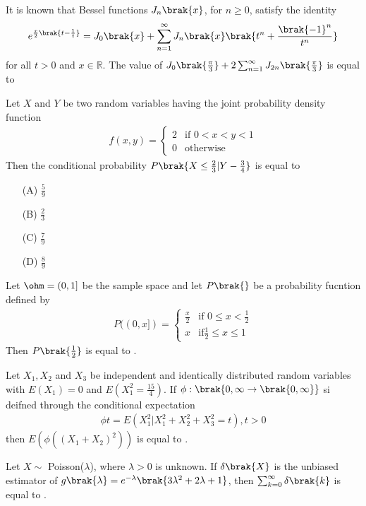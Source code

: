 \item It is known that Bessel functions $J_n\brak{x}$, for $n\geq 0$, satisfy the identity 
\begin{align*}
    e^{\frac{x}{2}\brak{t-\frac{1}{t}}}=J_0\brak{x}+\sum_{n=1}^\infty J_n\brak{x}\brak{t^n+\frac{\brak{-1}^n}{t^n}}
\end{align*}
for all $t>0$ and $x \in \mathbb{R}$. The value of $J_0\brak{\frac{\pi}{3}}+2\sum_{n=1}^\infty J_{2n}\brak{\frac{\pi}{3}}$ is equal to
\vspace{0.5cm}

\item Let $X$ and $Y$ be two random variables having the joint probability density function
\begin{align*}
    f(x, y) = \begin{cases}
    2 & \text{if } 0 < x < y < 1 \\
    0 & \text{otherwise}
\end{cases}
\end{align*}
Then the conditional probability $P\brak{X\leq \frac{2}{3}| Y-\frac{3}{4}}$ is equal to
\begin{multicols}{2}
\begin{enumerate}
    \item[(A)] $\frac{5}{9}$
    \item[(B)] $\frac{2}{3}$
    \item[(C)] $\frac{7}{9}$
    \item[(D)] $\frac{8}{9}$
\end{enumerate}
\end{multicols}

\vspace{0.5cm}

\item Let $\ohm =(0,1]$ be the sample space and let $P\brak{}$ be a probability fucntion defined by 
\begin{align*}
    P((0, x]) = \begin{cases}
    \frac{x}{2} & \text{if } 0 \leq x < \frac{1}{2} \\
    x & \text{if} \frac{1}{2}\leq x \leq 1
\end{cases}
\end{align*}
Then $P\brak{{{\frac{1}{2}}}}$ is equal to \underline{\hspace{2cm}}.
\vspace{0.5cm}

\item Let $X_1,X_2$ and $X_3$ be independent and identically distributed random variables with $E(X_1)=0$ and $E(X_1^2=\frac{15}{4})$. If $\phi:\brak{0,\infty \rightarrow \brak{0, \infty}}$ si deifned through the conditional expectation 
\begin{align*}
    \phi{t}=E(X_1^2|X_1^2+X_2^2+X_3^2 = t) , t>0
\end{align*}
then $E(\phi((X_1+X_2)^2))$ is equal to \underline{\hspace{2cm}}.

\vspace{0.5cm}

\item Let $X \sim$ Poisson($\lambda$), where $\lambda>0$ is unknown. If $\delta\brak{X}$ is the unbiased estimator of $g\brak{\lambda}=e^{-\lambda}\brak{3\lambda^2+2\lambda+1}$, then $\sum_{k=0}^\infty\delta\brak{k}$ is equal to \underline{\hspace{2cm}}.


